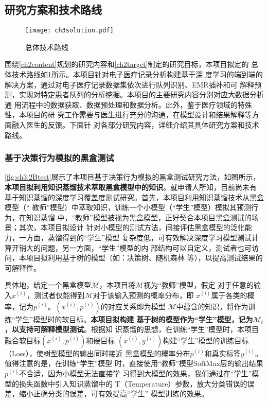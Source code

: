 \subsection{研究方案和技术路线}

\begin{figure}[h]
    \begin{small}
        \begin{center}
            \texttt{[image: ch3solution.pdf]}
        \end{center}
        \caption{总体技术路线}
        \label{fig:ch3:solution}
    \end{small}
\end{figure}

围绕\ref{ch2content}规划的研究内容和\ref{ch2target}制定的研究目标，本项目拟定的
总体技术路线如\cref{fig:ch3:solution}所示。本项目针对电子医疗记录分析构建基于深
度学习的端到端的解决方案，通过对电子医疗记录数据集依次进行队列识别、EMR插补和可
解释预测，实现对特定患者队列的分析挖掘。本项目的主要研究内容分别对应大数据分析通
用流程中的数据获取、数据预处理和数据分析。此外，鉴于医疗领域的特殊性，本项目的研
究工作需要与医生进行充分的沟通，在模型设计和结果解释等方面融入医生的反馈。下面针
对各部分研究内容，详细介绍其具体研究方案和技术路线。



\subsubsection{基于决策行为模拟的黑盒测试}\label{ch3_1}

\cref{fig:ch3:2Btest}展示了本项目基于决策行为模拟的黑盒测试研究方法，如图所示，
\textbf{本项目拟利用知识蒸馏技术萃取黑盒模型中的知识}。就申请人所知，目前尚未有
基于知识蒸馏的深度学习覆盖度测试研究。首先，本项目利用知识蒸馏技术从黑盒模型（``
教师''模型）中萃取知识，训练一个小模型（``学生''模型）模拟其预测行为，在知识蒸馏
中，``教师''模型被视为黑盒模型，正好契合本项目黑盒测试的场景；其次，本项目拟设计
针对小模型的测试方法，间接评估黑盒模型的泛化能力，一方面，蒸馏得到的``学生''模型
复杂度低，可有效解决深度学习模型测试计算开销大的问题，另一方面，``学生''模型的内
部结构可以自定义，测试者也可访问，本项目拟利用基于树的模型（如：决策树、随机森林
等），以提高测试结果的可解释性。

具体地，给定一个黑盒模型$\mathcal M$，本项目将$\mathcal M$视为``教师''模型，假定
对于任意的输入$x^{(i)}$，测试者仅能得到$\mathcal M$对于该输入预测的概率分布，即
$x^{(i)}$属于各类的概率，记为$p^{(i)}$。$(x^{(i)}, p^{(i)})$的对应关系即为模型
$\mathcal M$中蕴含的知识，将作为训练``学生''模型时的软目标。\textbf{本项目拟构建
基于树的模型作为``学生''模型，记为$\mathcal M_t$，以支持可解释模型测试}。根据知
识蒸馏的思想，在训练``学生''模型时，本项目融合软目标$(x^{(i)}, p^{(i)})$和硬目标
$(x^{(i)}, y^{(i)})$构建``学生''模型的训练目标（Loss），使树型模型的输出同时接近
黑盒模型的概率分布$p^{(i)}$和真实标签$y^{(i)}$。值得注意的是，在训练``学生''模型
时，直接使用``教师''模型SoftMax层的输出结果$p^{(i)}$不合适，因为小模型无法直接学
习得到大模型的效果，我们通过在``学生''模型的损失函数中引入知识蒸馏中的
T（Temperature）参数，放大分类错误的误差，缩小正确分类的误差，可有效提高``学生''
模型训练的效果。

